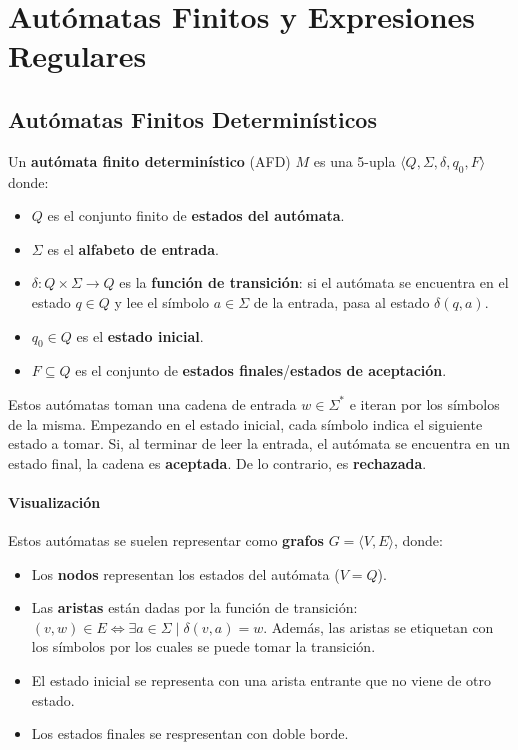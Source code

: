 \chapter{Autómatas Finitos y Expresiones Regulares}

\section{Autómatas Finitos Determinísticos}
\label{definicion-afds}

Un \textbf{autómata finito determinístico} (AFD) $M$ es una 5-upla $\langle Q, \Sigma, \delta, q_0, F \rangle$ donde:
\begin{itemize}
    \item $Q$ es el conjunto finito de \textbf{estados del autómata}.
    \item $\Sigma$ es el \textbf{alfabeto de entrada}.
    \item $\delta: Q \times \Sigma \to Q$ es la \textbf{función de transición}: si el autómata se encuentra en el estado $q \in Q$ y lee el símbolo $a \in \Sigma$ de la entrada, pasa al estado $\delta(q, a)$.
    \item $q_0 \in Q$ es el \textbf{estado inicial}.
    \item $F \subseteq Q$ es el conjunto de \textbf{estados finales}/\textbf{estados de aceptación}.
\end{itemize}


Estos autómatas toman una cadena de entrada $w \in \Sigma^*$ e iteran por los símbolos de la misma. Empezando en el estado inicial, cada símbolo indica el siguiente estado a tomar. Si, al terminar de leer la entrada, el autómata se encuentra en un estado final, la cadena es \textbf{aceptada}. De lo contrario, es \textbf{rechazada}.

\subsubsection{Visualización}

Estos autómatas se suelen representar como \textbf{grafos} $G = \langle V, E \rangle$, donde:
\begin{itemize}
    \item Los \textbf{nodos} representan los estados del autómata ($V = Q$).
    \item Las \textbf{aristas} están dadas por la función de transición: $(v, w) \in E \iff \exists a \in \Sigma \mid \delta(v, a) = w$. Además, las aristas se etiquetan con los símbolos por los cuales se puede tomar la transición.
    \item El estado inicial se representa con una arista entrante que no viene de otro estado.
    \item Los estados finales se respresentan con doble borde.
\end{itemize}

